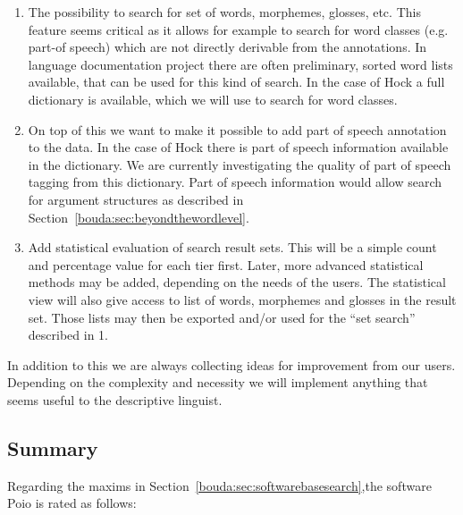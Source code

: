 \begin{enumerate}
\item The possibility to search for set of words, morphemes, glosses, etc. This feature seems critical as it allows for example to search for word classes (e.g. part-of speech) which are not directly derivable from the annotations. In language documentation project there are often preliminary, sorted word lists available, that can be used for this kind of search. In the case of Hoc{\A}k a full dictionary is available, which we will use to search for word classes.

\item On top of this we want to make it possible to add part of speech annotation to the data. In the case of Hoc{\A}k there is part of speech information available in the dictionary. We are currently investigating the quality of part of speech tagging from this dictionary. Part of speech information would allow search for argument structures as described in Section\ \ref{bouda:sec:beyondthewordlevel}.

\item Add statistical evaluation of search result sets. This will be a simple count and percentage value for each tier first. Later, more advanced statistical methods may be added, depending on the needs of the users. The statistical view will also give access to list of words, morphemes and glosses in the result set. Those lists may then be exported and/or used for the ``set search'' described in 1.
\end{enumerate}

In addition to this we are always collecting ideas for improvement from our users. Depending on the complexity and necessity we will implement anything that seems useful to the descriptive linguist.

\subsection{Summary}

Regarding the maxims in Section\ \ref{bouda:sec:softwarebasesearch},the software Poio is rated as follows:

